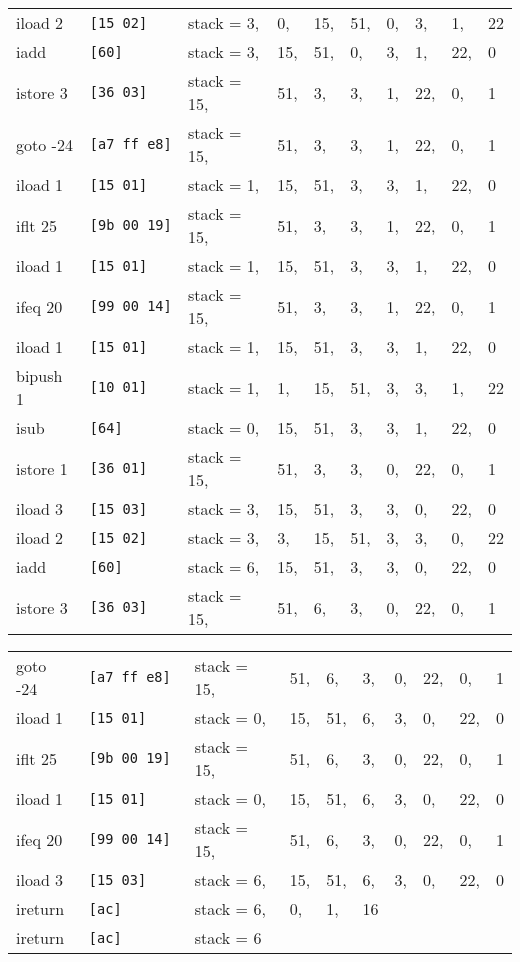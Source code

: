 \documentclass[12pt,a4paper]{article}
\begin{document}
\begin{tabular}{llllllllll}
iload 2             &\texttt{[15 02]    }& stack = 3,& 0,& 15,& 51,& 0,& 3,& 1,& 22 \\
iadd                &\texttt{[60]       }& stack = 3,& 15,& 51,& 0,& 3,& 1,& 22,& 0 \\
istore 3            &\texttt{[36 03]    }& stack = 15,& 51,& 3,& 3,& 1,& 22,& 0,& 1 \\
goto -24            &\texttt{[a7 ff e8] }& stack = 15,& 51,& 3,& 3,& 1,& 22,& 0,& 1 \\
iload 1             &\texttt{[15 01]    }& stack = 1,& 15,& 51,& 3,& 3,& 1,& 22,& 0 \\
iflt 25             &\texttt{[9b 00 19] }& stack = 15,& 51,& 3,& 3,& 1,& 22,& 0,& 1 \\
iload 1             &\texttt{[15 01]    }& stack = 1,& 15,& 51,& 3,& 3,& 1,& 22,& 0 \\
ifeq 20             &\texttt{[99 00 14] }& stack = 15,& 51,& 3,& 3,& 1,& 22,& 0,& 1 \\
iload 1             &\texttt{[15 01]    }& stack = 1,& 15,& 51,& 3,& 3,& 1,& 22,& 0 \\
bipush 1            &\texttt{[10 01]    }& stack = 1,& 1,& 15,& 51,& 3,& 3,& 1,& 22 \\
isub                &\texttt{[64]       }& stack = 0,& 15,& 51,& 3,& 3,& 1,& 22,& 0 \\
istore 1            &\texttt{[36 01]    }& stack = 15,& 51,& 3,& 3,& 0,& 22,& 0,& 1 \\
iload 3             &\texttt{[15 03]    }& stack = 3,& 15,& 51,& 3,& 3,& 0,& 22,& 0 \\
iload 2             &\texttt{[15 02]    }& stack = 3,& 3,& 15,& 51,& 3,& 3,& 0,& 22 \\
iadd                &\texttt{[60]       }& stack = 6,& 15,& 51,& 3,& 3,& 0,& 22,& 0 \\
istore 3            &\texttt{[36 03]    }& stack = 15,& 51,& 6,& 3,& 0,& 22,& 0,& 1 \\
\end{tabular}
\clearpage
\begin{tabular}{llllllllll}
goto -24            &\texttt{[a7 ff e8] }& stack = 15,& 51,& 6,& 3,& 0,& 22,& 0,& 1 \\
iload 1             &\texttt{[15 01]    }& stack = 0,& 15,& 51,& 6,& 3,& 0,& 22,& 0 \\
iflt 25             &\texttt{[9b 00 19] }& stack = 15,& 51,& 6,& 3,& 0,& 22,& 0,& 1 \\
iload 1             &\texttt{[15 01]    }& stack = 0,& 15,& 51,& 6,& 3,& 0,& 22,& 0 \\
ifeq 20             &\texttt{[99 00 14] }& stack = 15,& 51,& 6,& 3,& 0,& 22,& 0,& 1 \\
iload 3             &\texttt{[15 03]    }& stack = 6,& 15,& 51,& 6,& 3,& 0,& 22,& 0 \\
ireturn             &\texttt{[ac]       }& stack = 6,& 0,& 1,& 16 \\
ireturn             &\texttt{[ac]       }& stack = 6
\end{tabular}
\end{document}
